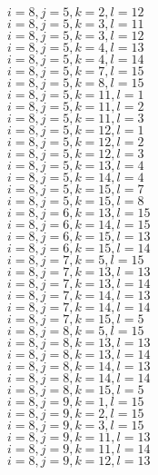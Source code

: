 \documentclass[14pt]{article}
\begin{document}
    $i=8,j=5,k=2,l=12 $ \\ 
    $i=8,j=5,k=3,l=11 $ \\ 
    $i=8,j=5,k=3,l=12 $ \\ 
    $i=8,j=5,k=4,l=13 $ \\ 
    $i=8,j=5,k=4,l=14 $ \\ 
    $i=8,j=5,k=7,l=15 $ \\ 
    $i=8,j=5,k=8,l=15 $ \\ 
    $i=8,j=5,k=11,l=1 $ \\ 
    $i=8,j=5,k=11,l=2 $ \\ 
    $i=8,j=5,k=11,l=3 $ \\ 
    $i=8,j=5,k=12,l=1 $ \\ 
    $i=8,j=5,k=12,l=2 $ \\ 
    $i=8,j=5,k=12,l=3 $ \\ 
    $i=8,j=5,k=13,l=4 $ \\ 
    $i=8,j=5,k=14,l=4 $ \\ 
    $i=8,j=5,k=15,l=7 $ \\ 
    $i=8,j=5,k=15,l=8 $ \\ 
    $i=8,j=6,k=13,l=15 $ \\ 
    $i=8,j=6,k=14,l=15 $ \\ 
    $i=8,j=6,k=15,l=13 $ \\ 
    $i=8,j=6,k=15,l=14 $ \\ 
    $i=8,j=7,k=5,l=15 $ \\ 
    $i=8,j=7,k=13,l=13 $ \\ 
    $i=8,j=7,k=13,l=14 $ \\ 
    $i=8,j=7,k=14,l=13 $ \\ 
    $i=8,j=7,k=14,l=14 $ \\ 
    $i=8,j=7,k=15,l=5 $ \\ 
    $i=8,j=8,k=5,l=15 $ \\ 
    $i=8,j=8,k=13,l=13 $ \\ 
    $i=8,j=8,k=13,l=14 $ \\ 
    $i=8,j=8,k=14,l=13 $ \\ 
    $i=8,j=8,k=14,l=14 $ \\ 
    $i=8,j=8,k=15,l=5 $ \\ 
    $i=8,j=9,k=1,l=15 $ \\ 
    $i=8,j=9,k=2,l=15 $ \\ 
    $i=8,j=9,k=3,l=15 $ \\ 
    $i=8,j=9,k=11,l=13 $ \\ 
    $i=8,j=9,k=11,l=14 $ \\ 
    $i=8,j=9,k=12,l=13 $ \\ 
\end{document}
